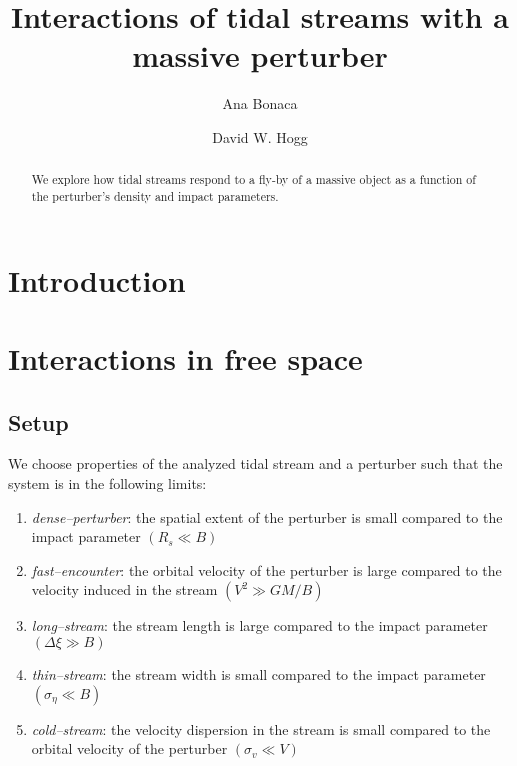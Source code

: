 \documentclass[modern]{aastex62}
\begin{document}
\sloppy\sloppypar\raggedbottom\frenchspacing %

\title{Interactions of tidal streams with a massive perturber}


\author[0000-0002-7846-9787]{Ana Bonaca}

\author[0000-0003-2866-9403]{David W. Hogg}

\begin{abstract}\noindent %
We explore how tidal streams respond to a fly-by of a massive object as a function of the perturber's density and impact parameters.
\end{abstract}


\section{Introduction}


\section{Interactions in free space}

\subsection{Setup}
We choose properties of the analyzed tidal stream and a perturber such that the system is in the following limits:
\begin{enumerate}
 \item{\emph{dense--perturber}: the spatial extent of the perturber is small compared to the impact parameter $(R_s\ll B)$
 }
 \item{\emph{fast--encounter}: the orbital velocity of the perturber is large compared to the velocity induced in the stream $(V^2\gg GM/B)$
 }
 \item{\emph{long--stream}: the stream length is large compared to the impact parameter $(\Delta\xi\gg B)$
 }
 \item{\emph{thin--stream}: the stream width is small compared to the impact parameter $(\sigma_\eta\ll B)$
 }
 \item{\emph{cold--stream}: the velocity dispersion in the stream is small compared to the orbital velocity of the perturber $(\sigma_v\ll V)$
 }
\end{enumerate}
\end{document}
